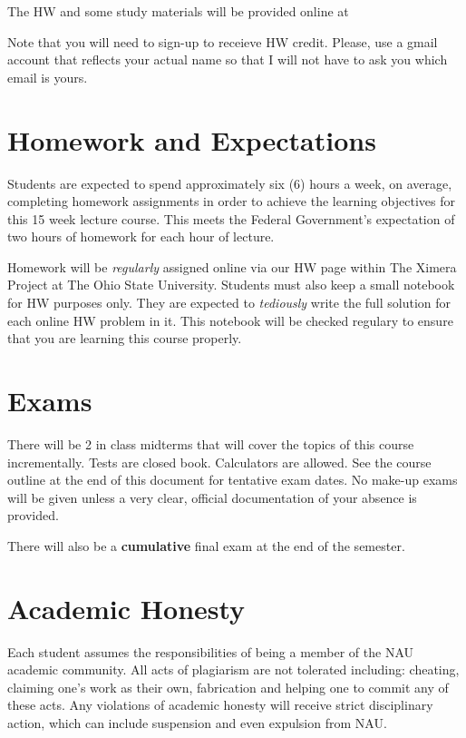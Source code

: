 \documentclass[handout]{ximera}
\begin{document}
The HW and some study materials will be provided online at 


Note that you will need to sign-up to receieve HW credit. Please, use a gmail account that reflects your actual name so that I will not have to ask you which email is yours.

\section*{Homework and Expectations}

Students are expected to spend approximately six (6) hours a week, on average, completing homework assignments in order to achieve the learning objectives for this 15 week lecture course. This meets the Federal Government’s expectation of two hours of homework for each hour of lecture. 

Homework will be {\it regularly} assigned online via our HW page within The Ximera Project at The Ohio State University. Students must also keep a small notebook for HW purposes only. They are expected to {\it tediously} write the full solution for each online HW problem in it. This notebook will be checked regulary to ensure that you are learning this course properly. 

\section*{Exams}

There will be 2 in class midterms that will cover the topics of this course incrementally. Tests are closed book. Calculators are allowed. See the course outline at the end of this document for tentative exam dates. No make-up exams will be given unless a very clear, official documentation of your absence is provided.

There will also be a {\bf cumulative} final exam at the end of the semester.

\section*{Academic Honesty}

Each student assumes the responsibilities of being a member of the NAU academic community.  All acts of plagiarism are not tolerated including: cheating, claiming one’s work as their own, fabrication and helping one to commit any of these acts.  Any violations of academic honesty will receive strict disciplinary action, which can include suspension and even expulsion from NAU.  
\end{document}
